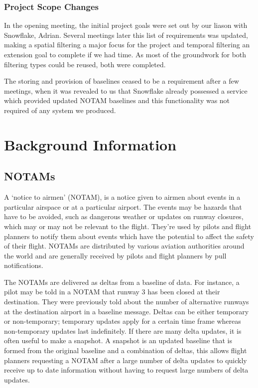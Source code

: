 \documentclass[a4paper, 12pt]{article}
\begin{document}
\subsubsection{Project Scope Changes}
In the opening meeting, the initial project goals were set out by our liason with Snowflake, Adrian. Several meetings later this list of requirements was updated, making a spatial filtering a major focus for the project and temporal filtering an extension goal to complete if we had time. As most of the groundwork for both filtering types could be reused, both were completed.

The storing and provision of baselines ceased to be a requirement after a few meetings, when it was revealed to us that Snowflake already possessed a service which provided updated NOTAM baselines and this functionality was not required of any system we produced.

\section{Background Information}

\subsection{NOTAMs}
A `notice to airmen' (NOTAM), is a notice given to airmen about events in a particular airspace or at a particular airport. The events may be hazards that have to be avoided, such as dangerous weather or updates on runway closures, which may or may not be relevant to the flight. They're used by pilots and flight planners to notify them about events which have the potential to affect the safety of their flight. NOTAMs are distributed by various aviation authorities around the world and are generally received by pilots and flight planners by pull notifications.

The NOTAMs are delivered as deltas from a baseline of data. For instance, a pilot may be told in a NOTAM that runway 3 has been closed at their destination. They were previously told about the number of alternative runways at the destination airport in a baseline message. Deltas can be either temporary or non-temporary; temporary updates apply for a certain time frame whereas non-temporary updates last indefinitely. If there are many delta updates, it is often useful to make a snapshot. A snapshot is an updated baseline that is formed from the original baseline and a combination of deltas, this allows flight planners requesting a NOTAM after a large number of delta updates to quickly receive up to date information without having to request large numbers of delta updates.
\end{document}
